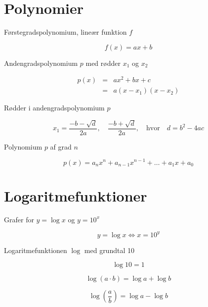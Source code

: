 \documentclass[11pt,a4paper,landscape,twocolumn,fleqn,leqno]{article}
\begin{document}
\newpage

\section{Polynomier}

Førstegradspolynomium, lineær funktion $f$

\begin{equation}
f(x) = ax+b
\end{equation}

Andengradspolynomium $p$ med rødder $x_1$ og $x_2$

\begin{eqnarray}
p(x) & = & ax^2 + bx + c \\
 & = & a(x-x_1)(x-x_2) \nonumber
\end{eqnarray}

Rødder i andengradspolynomium $p$

\begin{equation}
x_1 = \frac{-b - \sqrt{d}}{2a}, \quad \frac{-b + \sqrt{d}}{2a}, \quad \text{hvor} \quad d = b^2 - 4ac
\end{equation}

Polynomium $p$ af grad $n$

\begin{equation}
p(x) = a_nx^n + a_{n-1}x^{n-1} + \dots + a_1x + a_0
\end{equation}

\vfill

\section{Logaritmefunktioner}

Grafer for $y = \log x$ og $y = 10^x$

\begin{equation}
y = \log x \Leftrightarrow x = 10^y
\end{equation}

Logaritmefunktionen $\log$ med grundtal 10

\begin{equation}
\log 10 = 1
\end{equation}

\begin{equation}
\log(a \cdot b) = \log a + \log b
\end{equation}

\begin{equation}
\log\left(\frac{a}{b}\right) = \log a - \log b
\end{equation}
\end{document}
